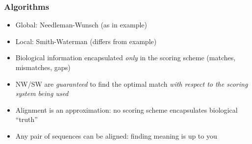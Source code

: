 \begin{frame}
  \frametitle{Algorithms}
  \begin{itemize}
    \item<1-> Global: Needleman-Wunsch (as in example)
    \item<1-> Local: Smith-Waterman (differs from example)
    \item<2-> Biological information encapsulated \emph{only} in the scoring scheme (matches, mismatches, gaps)
    \item<3-> NW/SW are \emph{guaranteed} to find the optimal match \emph{with respect to the scoring system being used}
    \item<3-> Alignment is an approximation: no scoring scheme encapsulates biological ``truth''
    \item<3-> Any pair of sequences can be aligned: finding meaning is up to you
  \end{itemize}
\end{frame}   